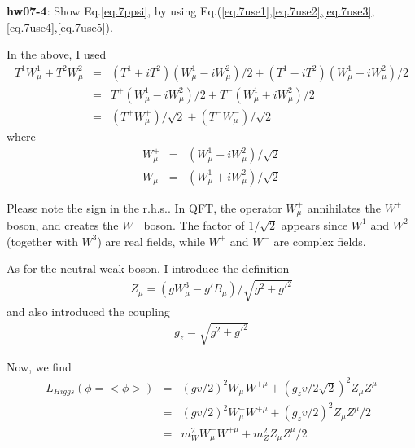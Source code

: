 \documentclass[12pt]{article}
\begin{document}
{\bf hw07-4}: Show Eq.\ref{eq.7ppsi}, by using Eq.(\ref{eq.7use1},\ref{eq.7use2},\ref{eq.7use3},\ref{eq.7use4},\ref{eq.7use5}).

  In the above, I used
  \begin{eqnarray}
    T^1 W^1_\mu + T^2 W^2_\mu
    &=& (T^1+iT^2)(W^1_\mu-iW^2_\mu)/2 + (T^1-iT^2)(W^1_\mu+iW^2_\mu)/2 \nonumber \\
    &=& T^+(W^1_\mu-iW^2_\mu)/2 + T^-(W^1_\mu+iW^2_\mu)/2  \nonumber \\
    &=& (T^+ W^+_\mu)/\sqrt2 + (T^- W^-_\mu)/\sqrt2 \label{eq.7use1}
  \end{eqnarray}
  where
\begin{eqnarray}
  W^+_\mu &=& (W^1_\mu - iW^2_\mu)/\sqrt2 \\ \label{eq.7use2}
  W^-_\mu &=& (W^1_\mu + iW^2_\mu)/\sqrt2 \label{eq.7use3}
\end{eqnarray}

  Please note the sign in the r.h.s..  In QFT, the operator $W^+_\mu$
  annihilates the $W^+$ boson, and creates the $W^-$ boson.  The factor
  of $1/\sqrt2$ appears since $W^1$ and $W^2$ (together with $W^3$) are real
  fields, while $W^+$ and $W^-$ are complex fields.

  As for the neutral weak boson, I introduce the definition
\begin{eqnarray}
  Z_\mu = (g W^3_\mu - g' B_\mu)/\sqrt{ g^2 + g'^2 } \label{eq.7use4}
\end{eqnarray}
  and also introduced the coupling
\begin{eqnarray}
  g_z = \sqrt{ g^2 + g'^2 } \label{eq.7use5}
\end{eqnarray} 

  Now, we find
\begin{eqnarray}
  L_{Higgs}(\phi=<\phi>)
  &=& (gv/2)^2 W^-_\mu W^{+ \mu} + (g_z v/2\sqrt2)^2 Z_\mu Z^\mu \nonumber \\
  &=& (gv/2)^2 W^-_\mu W^{+ \mu} + (g_z v/2)^2 Z_\mu Z^\mu/2 \nonumber \\
  &=& m_W^2 W^-_\mu W^{+ \mu} + m_Z^2 Z_\mu Z^\mu/2 \label{eq.7LH}
\end{eqnarray}
\end{document}

